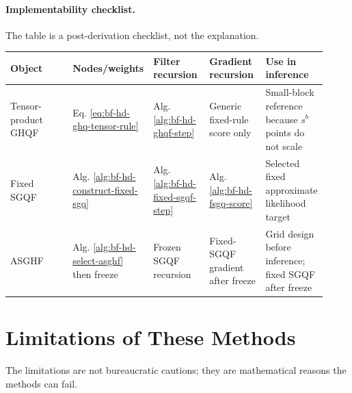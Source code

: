 \paragraph{Implementability checklist.}
The table is a post-derivation checklist, not the explanation.

\begin{longtable}{@{}p{0.22\linewidth}p{0.18\linewidth}p{0.18\linewidth}p{0.18\linewidth}p{0.16\linewidth}@{}}
\toprule
Object & Nodes/weights & Filter recursion & Gradient recursion & Use in inference \\
\midrule
\endhead
Tensor-product GHQF & Eq. \eqref{eq:bf-hd-ghq-tensor-rule} &
Alg. \ref{alg:bf-hd-ghqf-step} & Generic fixed-rule score only &
Small-block reference because \(s^b\) points do not scale \\
Fixed SGQF & Alg. \ref{alg:bf-hd-construct-fixed-sgq} &
Alg. \ref{alg:bf-hd-fixed-sgqf-step} &
Alg. \ref{alg:bf-hd-fsgq-score} &
Selected fixed approximate likelihood target \\
ASGHF & Alg. \ref{alg:bf-hd-select-asghf} then freeze &
Frozen SGQF recursion & Fixed-SGQF gradient after freeze &
Grid design before inference; fixed SGQF after freeze \\
\bottomrule
\end{longtable}

\section{Limitations of These Methods}
\label{sec:bf-hd-gq-defects}

The limitations are not bureaucratic cautions; they are mathematical reasons
the methods can fail.

